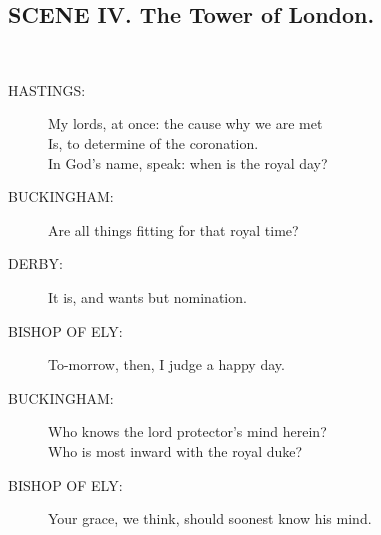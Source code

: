 \documentclass{article}
\begin{document}
\subsection*{SCENE IV.  The Tower of London.}
\\
\begin{description}
\item[HASTINGS:] 
\hspace{1pt}My lords, at once: the cause why we are met\\
\hspace{1pt}Is, to determine of the coronation.\\
\hspace{1pt}In God's name, speak: when is the royal day?\\
\end{description}
\begin{description}
\item[BUCKINGHAM:] 
\hspace{1pt}Are all things fitting for that royal time?\\
\end{description}
\begin{description}
\item[DERBY:] 
\hspace{1pt}It is, and wants but nomination.\\
\end{description}
\begin{description}
\item[BISHOP OF ELY:] 
\hspace{1pt}To-morrow, then, I judge a happy day.\\
\end{description}
\begin{description}
\item[BUCKINGHAM:] 
\hspace{1pt}Who knows the lord protector's mind herein?\\
\hspace{1pt}Who is most inward with the royal duke?\\
\end{description}
\begin{description}
\item[BISHOP OF ELY:] 
\hspace{1pt}Your grace, we think, should soonest know his mind.\\
\end{description}
\end{document}
